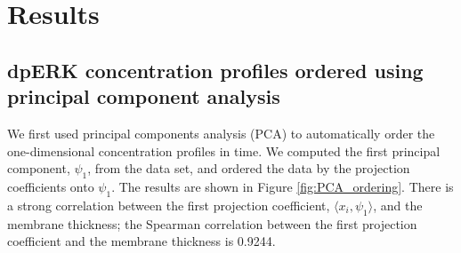 \documentclass[10pt]{article}
\begin{document}
\section*{Results}

\subsection*{dpERK concentration profiles ordered using principal component analysis}

We first used principal components analysis (PCA) to automatically order the one-dimensional concentration profiles in time. 
%
We computed the first principal component, $\psi_1$, from the data set, and ordered the data by the projection coefficients onto $\psi_1$.
%
The results are shown in Figure \ref{fig:PCA_ordering}.
%
There is a strong correlation between the first projection coefficient, $\langle x_i, \psi_1 \rangle$, and the membrane thickness;
the Spearman correlation between the first projection coefficient and the membrane thickness is 0.9244.
\end{document}
